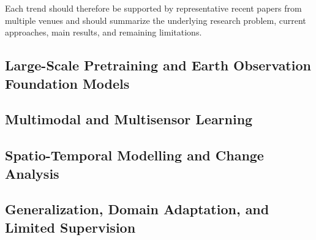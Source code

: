\documentclass[11pt,a4paper]{article}
\begin{document}
Each trend should therefore be supported by representative recent papers
from multiple venues and should summarize the underlying research
problem, current approaches, main results, and remaining limitations.

\subsection{Large-Scale Pretraining and Earth Observation Foundation Models}


\subsection{Multimodal and Multisensor Learning}


\subsection{Spatio-Temporal Modelling and Change Analysis}


\subsection{Generalization, Domain Adaptation, and Limited Supervision}
\end{document}
